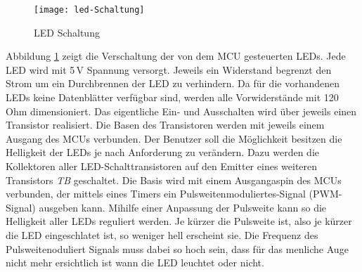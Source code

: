 \begin{figure}[h]
	\begin{center}
		\texttt{[image: led-Schaltung]}
		\caption{LED Schaltung}
		\label{fig:LED-Schaltung}
	\end{center}
\end{figure}
Abbildung \ref{fig:LED-Schaltung} zeigt die Verschaltung der von dem MCU gesteuerten LEDs. Jede LED wird mit 5\,V Spannung versorgt. Jeweils ein Widerstand begrenzt den Strom um ein Durchbrennen der LED zu verhindern. Da für die vorhandenen LEDs keine Datenblätter verfügbar sind, werden alle Vorwiderstände mit 120\,Ohm dimensioniert. Das eigentliche Ein- und Ausschalten wird über jeweils einen Transistor realisiert. Die Basen des Transistoren werden mit jeweils einem Ausgang des MCUs verbunden. Der Benutzer soll die Möglichkeit besitzen die Helligkeit der LEDs je nach Anforderung zu verändern. Dazu werden die Kollektoren aller LED-Schalttransistoren auf den Emitter eines weiteren Transistors \textit{TB} geschaltet. Die Basis wird mit einem Ausgangaspin des MCUs verbunden, der mittels eines Timers ein Pulsweitenmoduliertes-Signal (PWM-Signal) ausgeben kann. Mihilfe einer Anpassung der Pulsweite kann so die Helligkeit aller LEDs reguliert werden. Je kürzer die Pulsweite ist, also je kürzer die LED eingeschlatet ist, so weniger hell erscheint sie. Die Frequenz des Pulsweitenoduliert Signals muss dabei so hoch sein, dass für das menliche Auge nicht mehr ersichtlich ist wann die LED leuchtet oder nicht.\\
%
